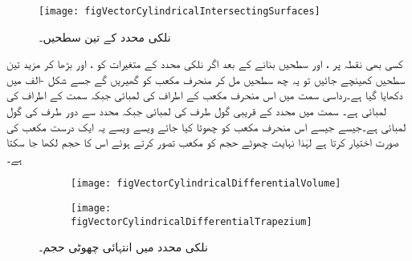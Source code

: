 \begin{figure}
\centering
\texttt{[image: figVectorCylindricalIntersectingSurfaces]}
\caption{نلکی محدد کے تین سطحیں۔}
\label{شکل_سمتیہ_نلکی_تین_سطحیں}
\end{figure}
کسی بھی نقطہ  پر ،  اور  سطحیں  بنانے کے بعد اگر نلکی محدد کے متغیرات کو ،  اور  بڑھا کر مزید تین سطحیں کھینچے جائیں تو یہ چھ سطحیں مل کر منحرف مکعب کو گھیریں گے جسے شکل -الف میں دکھایا گیا ہے۔رداسی سمت میں اس منحرف مکعب کے اطراف کی لمبائی  جبکہ   سمت کے اطراف کی لمبائی  ہے۔  سمت میں  محدد کے قریبی  گول طرف کی لمبائی  جبکہ محدد سے دور طرف کی گول لمبائی  ہے۔جیسے جیسے اس منحرف مکعب کو چھوٹا کیا جائے ویسے ویسے یہ ایک درست مکعب کی صورت اختیار کرتا ہے لہٰذا نہایت چھوٹے حجم کو مکعب تصور کرتے ہوئے اس کا حجم  لکھا جا سکتا ہے۔
\begin{figure}
\centering
\begin{subfigure}{0.5\textwidth}
\centering
\texttt{[image: figVectorCylindricalDifferentialVolume]}
\end{subfigure}%
%
\begin{subfigure}{0.5\textwidth}
\centering
\texttt{[image: figVectorCylindricalDifferentialTrapezium]}
\end{subfigure}%
\caption{نلکی محدد میں انتہائی چھوٹی حجم۔}
\label{شکل_سمتیہ_نلکی_چھوٹی_حجم}
\end{figure}


